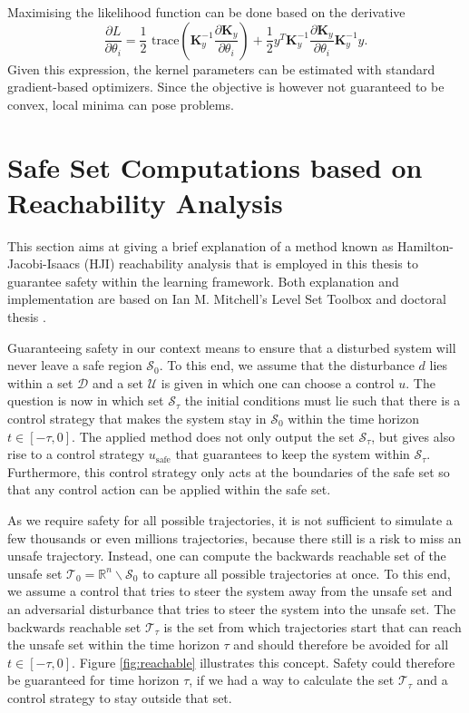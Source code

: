 \documentclass[../main.tex]{subfiles}
\begin{document}
Maximising the likelihood function can be done based on the derivative
\begin{equation}
    \frac{\partial L}{\partial \theta_i} = \dfrac{1}{2} \text{ trace} \left( \mathbf{K}_y^{-1} \frac{\partial \mathbf{K}_y}{\partial \theta_i} \right) + \frac{1}{2}y^T\mathbf{K}_y^{-1} \frac{\partial \mathbf{K}_y}{\partial \theta_i} \mathbf{K}_y^{-1} y.
\end{equation}
Given this expression, the kernel parameters can be estimated with standard gradient-based optimizers. Since the objective is however not guaranteed to be convex, local minima can pose problems.


\section{Safe Set Computations based on Reachability Analysis}\label{sec:SafeSets}
This section aims at giving a brief explanation of a method known as Hamilton-Jacobi-Isaacs (HJI) reachability analysis that is employed in this thesis to guarantee safety within the learning framework. Both explanation and implementation are based on Ian M. Mitchell's Level Set Toolbox \cite{mitchell2004toolbox} and doctoral thesis \cite{mitchell2003application}.

Guaranteeing safety in our context means to ensure that a disturbed system will never leave a safe region $\mathcal{S}_0$. To this end, we assume that the disturbance $d$ lies within a set $\mathcal{D}$ and a set $\mathcal{U}$ is given in which one can choose a control $u$. The question is now in which set $\mathcal{S}_\tau$ the initial conditions must lie such that there is a control strategy that makes the system stay in $\mathcal{S}_0$ within the time horizon $t \in [-\tau,0]$. The applied method does not only output the set $\mathcal{S}_\tau$, but gives also rise to a control strategy $u_{\text{safe}}$ that guarantees to keep the system within $\mathcal{S}_\tau$. Furthermore, this control strategy only acts at the boundaries of the safe set so that any control action can be applied within the safe set.

As we require safety for all possible trajectories, it is not sufficient to simulate a few thousands or even millions trajectories, because there still is a risk to miss an unsafe trajectory. Instead, one can compute the backwards reachable set of the unsafe set $\mathcal{T}_0 = \mathbb{R}^n\backslash \mathcal{S}_0$ to capture all possible trajectories at once. To this end, we assume a control that tries to steer the system away from the unsafe set and an adversarial disturbance that tries to steer the system into the unsafe set. The backwards reachable set $\mathcal{T}_\tau$ is the set from which trajectories start that can reach the unsafe set within the time horizon $\tau$ and should therefore be avoided for all $t \in [-\tau,0]$. Figure \ref{fig:reachable} illustrates this concept. Safety could therefore be guaranteed for time horizon $\tau$, if we had a way to calculate the set $\mathcal{T}_\tau$ and a control strategy to stay outside that set. 
\end{document}
